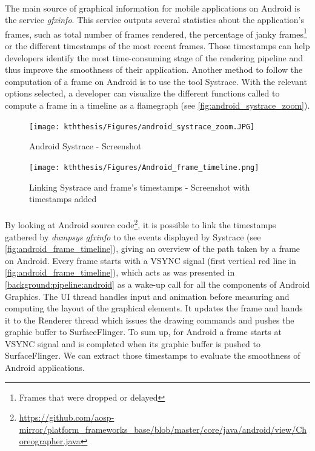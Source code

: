     \paragraph{}
    The main source of graphical information for mobile applications on Android is the service \textit{gfxinfo}. This service outputs several statistics about the application's frames, such as total number of frames rendered, the percentage of janky frames\footnote{Frames that were dropped or delayed} or the different timestamps of the most recent frames. Those timestamps can help developers identify the most time-consuming stage of the rendering pipeline and thus improve the smoothness of their application. \newline
    \indent Another method to follow the computation of a frame on Android is to use the tool Systrace. With the relevant options selected, a developer can visualize the different functions called to compute a frame in a timeline as a flamegraph (see \autoref{fig:android_systrace_zoom}).
    
    \begin{figure}
        \centering
        \texttt{[image: kththesis/Figures/android\_systrace\_zoom.JPG]}
        \caption{Android Systrace - Screenshot}
        \label{fig:android_systrace_zoom}
    \end{figure}
    
    \begin{figure}[!ht]
        \centering
        \texttt{[image: kththesis/Figures/Android\_frame\_timeline.png]}
        \caption{Linking Systrace and frame's timestamps - Screenshot with timestamps added}
        \label{fig:android_frame_timeline}
    \end{figure}
    
    \paragraph{}
    By looking at Android source code\footnote{\url{https://github.com/aosp-mirror/platform_frameworks_base/blob/master/core/java/android/view/Choreographer.java}}, it is possible to link the timestamps gathered by \textit{dumpsys gfxinfo} to the events displayed by Systrace (see \autoref{fig:android_frame_timeline}), giving an overview of the path taken by a frame on Android. \newline
    \indent Every frame starts with a VSYNC signal (first vertical red line in \autoref{fig:android_frame_timeline}), which acts as was presented in \autoref{background:pipeline:android} as a wake-up call for all the components of Android Graphics. The UI thread handles input and animation before measuring and computing the layout of the graphical elements. It updates the frame and hands it to the Renderer thread which issues the drawing commands and pushes the graphic buffer to SurfaceFlinger. To sum up, for Android a frame starts at VSYNC signal and is completed when its graphic buffer is pushed to SurfaceFlinger. We can extract those timestamps to evaluate the smoothness of Android applications.
    
